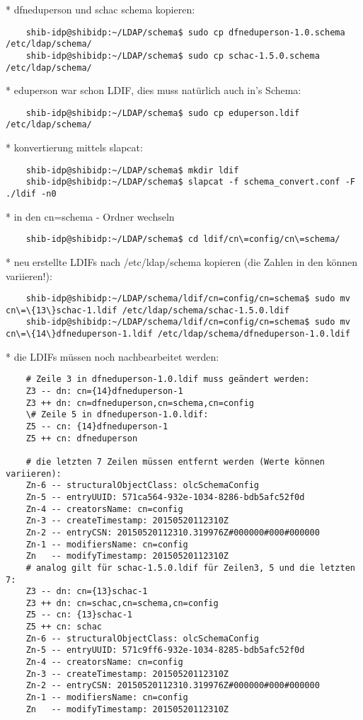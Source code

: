 * dfneduperson und schac schema kopieren:
\begin{lstlisting}
	shib-idp@shibidp:~/LDAP/schema$ sudo cp dfneduperson-1.0.schema /etc/ldap/schema/
	shib-idp@shibidp:~/LDAP/schema$ sudo cp schac-1.5.0.schema /etc/ldap/schema/
\end{lstlisting}
* eduperson war schon LDIF, dies muss natürlich auch in's Schema:	
\begin{lstlisting}
	shib-idp@shibidp:~/LDAP/schema$ sudo cp eduperson.ldif /etc/ldap/schema/
\end{lstlisting}
* konvertierung mittels slapcat:
\begin{lstlisting}
	shib-idp@shibidp:~/LDAP/schema$ mkdir ldif
	shib-idp@shibidp:~/LDAP/schema$ slapcat -f schema_convert.conf -F ./ldif -n0
\end{lstlisting}
* in den cn=schema - Ordner wechseln 
\begin{lstlisting}
	shib-idp@shibidp:~/LDAP/schema$ cd ldif/cn\=config/cn\=schema/
\end{lstlisting}
* neu erstellte LDIFs nach /etc/ldap/schema kopieren (die Zahlen in den {} können variieren!):
\begin{lstlisting}
	shib-idp@shibidp:~/LDAP/schema/ldif/cn=config/cn=schema$ sudo mv cn\=\{13\}schac-1.ldif /etc/ldap/schema/schac-1.5.0.ldif
	shib-idp@shibidp:~/LDAP/schema/ldif/cn=config/cn=schema$ sudo mv cn\=\{14\}dfneduperson-1.ldif /etc/ldap/schema/dfneduperson-1.0.ldif
\end{lstlisting}
* die LDIFs müssen noch nachbearbeitet werden:
\begin{lstlisting}
	# Zeile 3 in dfneduperson-1.0.ldif muss geändert werden:
	Z3 -- dn: cn={14}dfneduperson-1
	Z3 ++ dn: cn=dfneduperson,cn=schema,cn=config
	\# Zeile 5 in dfneduperson-1.0.ldif:
	Z5 -- cn: {14}dfneduperson-1
	Z5 ++ cn: dfneduperson
	 
	# die letzten 7 Zeilen müssen entfernt werden (Werte können variieren):
	Zn-6 -- structuralObjectClass: olcSchemaConfig
	Zn-5 -- entryUUID: 571ca564-932e-1034-8286-bdb5afc52f0d
	Zn-4 -- creatorsName: cn=config
	Zn-3 -- createTimestamp: 20150520112310Z
	Zn-2 -- entryCSN: 20150520112310.319976Z#000000#000#000000
	Zn-1 -- modifiersName: cn=config
	Zn   -- modifyTimestamp: 20150520112310Z
	# analog gilt für schac-1.5.0.ldif für Zeilen3, 5 und die letzten 7:
	Z3 -- dn: cn={13}schac-1
	Z3 ++ dn: cn=schac,cn=schema,cn=config
	Z5 -- cn: {13}schac-1
	Z5 ++ cn: schac
	Zn-6 -- structuralObjectClass: olcSchemaConfig
	Zn-5 -- entryUUID: 571c9ff6-932e-1034-8285-bdb5afc52f0d
	Zn-4 -- creatorsName: cn=config
	Zn-3 -- createTimestamp: 20150520112310Z
	Zn-2 -- entryCSN: 20150520112310.319976Z#000000#000#000000
	Zn-1 -- modifiersName: cn=config
	Zn   -- modifyTimestamp: 20150520112310Z
\end{lstlisting}
